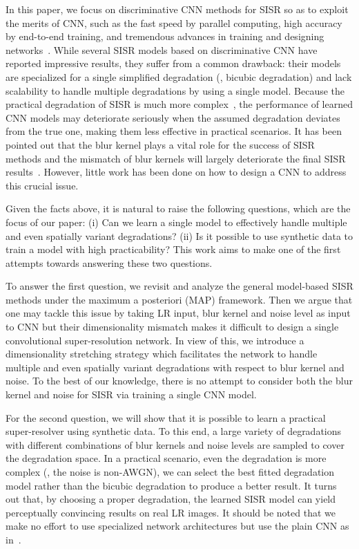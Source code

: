 \documentclass[10pt,twocolumn,letterpaper]{article}
\begin{document}
In this paper, we focus on discriminative CNN methods for SISR so as to exploit the merits of CNN, such as the fast speed by parallel computing, high accuracy by end-to-end training, and tremendous advances in training and designing networks~\cite{lecun2015deep,jaderberg2015spatial,goodfellow2014generative,he2016deep}.
While several SISR models based on discriminative CNN have reported impressive results, they suffer from a common drawback: their models are specialized for a single simplified degradation (\eg, bicubic degradation) and lack scalability to handle multiple degradations by using a single model. Because the practical degradation of SISR is much more complex~\cite{romano2017raisr,yang2014single}, the performance of learned CNN models may deteriorate seriously when the assumed degradation deviates from the true one, making them less effective in practical scenarios. It has been pointed out that the blur kernel plays a vital role for the success of SISR methods and the mismatch of blur kernels will largely deteriorate the final SISR results~\cite{efrat2013accurate}.
However, little work has been done on how to design a CNN to address this crucial issue.


Given the facts above,
it is natural to raise the following questions, which are the focus of our paper:
(i) Can we learn a single model to effectively handle multiple and even spatially variant degradations?
(ii) Is it possible to use synthetic data to train a model with high practicability?
This work aims to make one of the first attempts towards answering these two questions.


To answer the first question, we revisit and analyze the general model-based SISR methods under the maximum a posteriori (MAP) framework. Then we argue that one may tackle this issue by taking LR input, blur kernel and noise level as input to CNN but their dimensionality mismatch makes it difficult to design a single convolutional super-resolution network. In view of this, we introduce a dimensionality stretching strategy which facilitates the network to handle multiple and even spatially variant degradations with respect to blur kernel and noise. To the best of our knowledge, there is no attempt to consider  both the blur kernel and noise for SISR via training a single CNN model.


For the second question, we will show that it is possible to learn a practical super-resolver using synthetic data. To this end, a large variety of degradations with different combinations of blur kernels and noise levels are sampled to cover the degradation space. In a practical scenario, even the degradation is more complex (\eg, the noise is non-AWGN), we can select the best fitted degradation model rather than the bicubic degradation to produce a better result. It turns out that, by choosing a proper degradation, the learned SISR model can yield perceptually convincing results on real LR images. It should be noted that we make no effort to use specialized network architectures but use the plain CNN as in~\cite{dong2016image,shi2016real}.%
\end{document}
